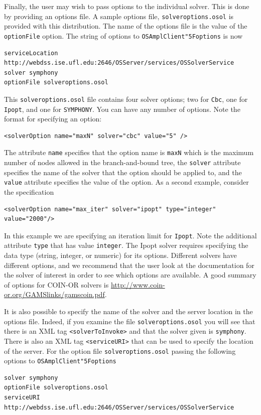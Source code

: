 \documentclass[11pt]{article}
\renewcommand{\_}{{\char"5F}}
\renewcommand{\{}{{\char"7B}}
\renewcommand{\}}{{\char"7D}}
\renewcommand{\^}{{\char"0D}}
\renewcommand{\'}{{\char"0D}}
\begin{document}
\begin{enumerate}[Step 1:]
Finally, the user may wish to pass options to the individual solver. This is done by providing an options file.
A sample options file, {\tt solveroptions.osol} is 
provided with this distribution.  The name of the options file is the value of the {\tt optionFile} option.
The string of options to {\tt OSAmplClient\_options} is now
\begin{verbatim}
serviceLocation http://webdss.ise.ufl.edu:2646/OSServer/services/OSSolverService
solver symphony 
optionFile solveroptions.osol
\end{verbatim}
This   {\tt solveroptions.osol}  file contains four solver options; two for {\tt Cbc}, one for {\tt Ipopt}, 
and one for {\tt SYMPHONY}.  You can have any number of options. Note the format for specifying an option:
\begin{verbatim}
<solverOption name="maxN" solver="cbc" value="5" />
\end{verbatim}
The attribute {\tt name} specifies that the option name is {\tt maxN} which is the maximum number of nodes 
allowed in the branch-and-bound tree, the {\tt solver} attribute specifies the name of the solver that the 
option should be applied to, and the {\tt value} attribute specifies the value of the option. 
As a second example, consider the specification
\begin{verbatim}
<solverOption name="max_iter" solver="ipopt" type="integer" value="2000"/> 
\end{verbatim}
In this example we are specifying an iteration limit for {\tt Ipopt}.  Note the additional attribute 
{\tt type} that has value  {\tt integer}. The Ipopt solver requires specifying the data type 
(string, integer, or numeric) for its options.   Different solvers have different options, 
and we recommend that the user look at the documentation for the solver of interest in order to see 
which options are available.  
A good summary of options for COIN-OR solvers is \url{http://www.coin-or.org/GAMSlinks/gamscoin.pdf}.


It is also possible to specify the name of the solver and the server location in the options file. 
Indeed, if you examine the file {\tt solveroptions.osol} you will see that there is an XML tag 
{\tt <solverToInvoke>} and that the solver given is {\tt symphony}. There is also an XML tag 
{\tt <serviceURI>} that can be used to specify the location of the server.  For the option file 
{\tt solveroptions.osol}  passing the following options to  {\tt OSAmplClient\_options} 
\begin{verbatim}
solver symphony
optionFile solveroptions.osol
serviceURI http://webdss.ise.ufl.edu:2646/OSServer/services/OSSolverService
\end{verbatim}


\end{enumerate}
\end{document}
